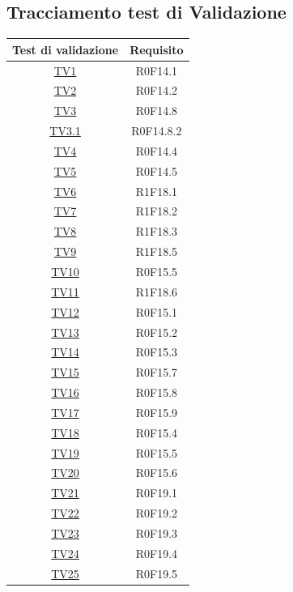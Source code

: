 \documentclass[../PianoDiQualifica.tex]{subfiles}
\begin{document}
\subsection{Tracciamento test di Validazione}
\normalsize
\begin{longtable}{|c|c|}
	\hline
	\textbf{Test di validazione} & \textbf{Requisito}\\
	\hline
	\endhead
	\hyperlink{TV1}{TV1} & R0F14.1  \\
	\hline
	\hyperlink{TV2}{TV2} & R0F14.2  \\
	\hline
	\hyperlink{TV3}{TV3} & R0F14.8   \\
	\hline
	\hyperlink{TV3.1}{TV3.1} & R0F14.8.2   \\
	\hline
	\hyperlink{TV4}{TV4} & R0F14.4   \\
	\hline
	\hyperlink{TV5}{TV5} & R0F14.5   \\
	\hline
	\hyperlink{TV6}{TV6} & R1F18.1   \\
	\hline
	\hyperlink{TV7}{TV7} & R1F18.2   \\
	\hline
	\hyperlink{TV8}{TV8} & R1F18.3   \\
	\hline
	\hyperlink{TV9}{TV9} & R1F18.5   \\
	\hline
	\hyperlink{TV10}{TV10} & R0F15.5   \\
	\hline
	\hyperlink{TV11}{TV11} & R1F18.6   \\
	\hline
	\hyperlink{TV12}{TV12} & R0F15.1   \\
	\hline
	\hyperlink{TV13}{TV13} & R0F15.2   \\
	\hline
	\hyperlink{TV14}{TV14} & R0F15.3   \\
	\hline
	\hyperlink{TV15}{TV15} & R0F15.7   \\
	\hline
	\hyperlink{TV16}{TV16} & R0F15.8   \\
	\hline
	\hyperlink{TV17}{TV17} & R0F15.9   \\
	\hline
	\hyperlink{TV18}{TV18} & R0F15.4   \\
	\hline
	\hyperlink{TV19}{TV19} & R0F15.5   \\
	\hline
	\hyperlink{TV20}{TV20} & R0F15.6   \\
	\hline
	\hyperlink{TV21}{TV21} & R0F19.1   \\
	\hline
	\hyperlink{TV22}{TV22} & R0F19.2   \\
	\hline
	\hyperlink{TV23}{TV23} & R0F19.3   \\
	\hline
	\hyperlink{TV24}{TV24} & R0F19.4   \\
	\hline
	\hyperlink{TV25}{TV25} & R0F19.5   \\

\end{longtable}
\end{document}
